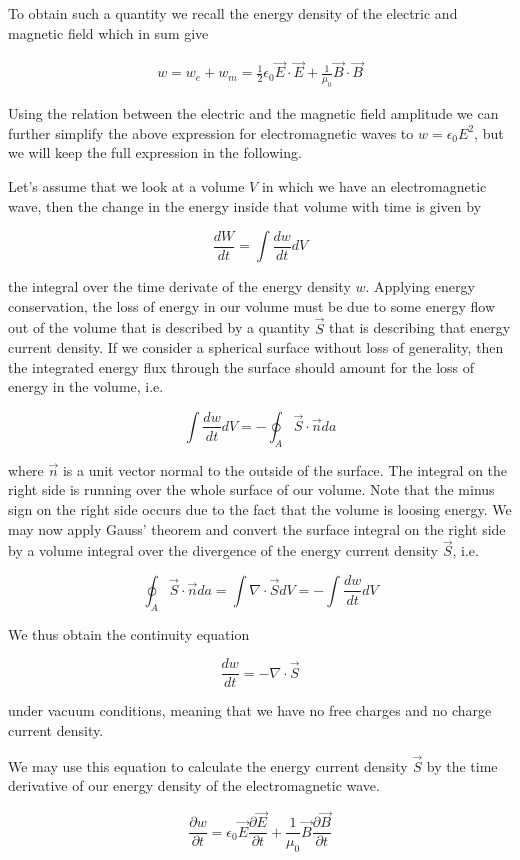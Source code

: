 \documentclass[
  a4paper,
]{book}
\begin{document}
To obtain such a quantity we recall the energy density of the electric
and magnetic field which in sum give

\begin{eqnarray}
w=w_e+w_m=\frac{1}{2}\epsilon_0 \vec{E}\cdot\vec{E}+\frac{1}{\mu_0}\vec{B}\cdot\vec{B}
\end{eqnarray}

Using the relation between the electric and the magnetic field amplitude
we can further simplify the above expression for electromagnetic waves
to \(w=\epsilon_0 E^2\), but we will keep the full expression in the
following.

Let's assume that we look at a volume \(V\) in which we have an
electromagnetic wave, then the change in the energy inside that volume
with time is given by

\[
\frac{dW}{dt}=\int \frac{dw}{dt}dV
\]

the integral over the time derivate of the energy density \(w\).
Applying energy conservation, the loss of energy in our volume must be
due to some energy flow out of the volume that is described by a
quantity \(\vec{S}\) that is describing that energy current density. If
we consider a spherical surface without loss of generality, then the
integrated energy flux through the surface should amount for the loss of
energy in the volume, i.e.

\[
\int \frac{dw}{dt}dV=-\oint_A \vec{S}\cdot \vec{n}da
\]

where \(\vec{n}\) is a unit vector normal to the outside of the surface.
The integral on the right side is running over the whole surface of our
volume. Note that the minus sign on the right side occurs due to the
fact that the volume is loosing energy. We may now apply Gauss' theorem
and convert the surface integral on the right side by a volume integral
over the divergence of the energy current density \(\vec{S}\), i.e.

\[
\oint_A \vec{S}\cdot \vec{n}da=\int \nabla \cdot\vec{S}dV=-\int \frac{dw}{dt}dV
\]

We thus obtain the continuity equation

\[
\frac{dw}{dt}=-\nabla \cdot\vec{S}
\]

under vacuum conditions, meaning that we have no free charges and no
charge current density.

We may use this equation to calculate the energy current density
\(\vec{S}\) by the time derivative of our energy density of the
electromagnetic wave.

\[
\frac{\partial w}{\partial t}=\epsilon_0 \vec{E}\frac{\partial \vec{E}}{\partial t} + \frac{1}{\mu_0}\vec{B}\frac{\partial \vec{B}}{\partial t}
\label{eq:ed}\tag{ED}
\]
\end{document}
